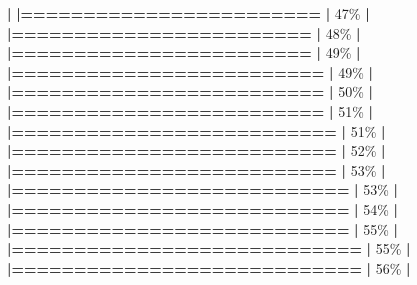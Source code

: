 \documentclass[
]{book}
\newenvironment{Shaded}{\begin{snugshade}}{\end{snugshade}}
\newcommand{\DecValTok}[1]{\textcolor[rgb]{0.00,0.00,0.81}{#1}}
\newcommand{\ErrorTok}[1]{\textcolor[rgb]{0.64,0.00,0.00}{\textbf{#1}}}
\newcommand{\NormalTok}[1]{#1}
\newcommand{\SpecialCharTok}[1]{\textcolor[rgb]{0.81,0.36,0.00}{\textbf{#1}}}
\begin{document}
\begin{Shaded}
\begin{Highlighting}[]
  \SpecialCharTok{|}                                                        
  \ErrorTok{|========================}                          \ErrorTok{|}  \DecValTok{47}\NormalTok{\%}
  \SpecialCharTok{|}                                                        
  \ErrorTok{|========================}                          \ErrorTok{|}  \DecValTok{48}\NormalTok{\%}
  \SpecialCharTok{|}                                                        
  \ErrorTok{|========================}                          \ErrorTok{|}  \DecValTok{49}\NormalTok{\%}
  \SpecialCharTok{|}                                                        
  \ErrorTok{|=========================}                         \ErrorTok{|}  \DecValTok{49}\NormalTok{\%}
  \SpecialCharTok{|}                                                        
  \ErrorTok{|=========================}                         \ErrorTok{|}  \DecValTok{50}\NormalTok{\%}
  \SpecialCharTok{|}                                                        
  \ErrorTok{|=========================}                         \ErrorTok{|}  \DecValTok{51}\NormalTok{\%}
  \SpecialCharTok{|}                                                        
  \ErrorTok{|==========================}                        \ErrorTok{|}  \DecValTok{51}\NormalTok{\%}
  \SpecialCharTok{|}                                                        
  \ErrorTok{|==========================}                        \ErrorTok{|}  \DecValTok{52}\NormalTok{\%}
  \SpecialCharTok{|}                                                        
  \ErrorTok{|==========================}                        \ErrorTok{|}  \DecValTok{53}\NormalTok{\%}
  \SpecialCharTok{|}                                                        
  \ErrorTok{|===========================}                       \ErrorTok{|}  \DecValTok{53}\NormalTok{\%}
  \SpecialCharTok{|}                                                        
  \ErrorTok{|===========================}                       \ErrorTok{|}  \DecValTok{54}\NormalTok{\%}
  \SpecialCharTok{|}                                                        
  \ErrorTok{|===========================}                       \ErrorTok{|}  \DecValTok{55}\NormalTok{\%}
  \SpecialCharTok{|}                                                        
  \ErrorTok{|============================}                      \ErrorTok{|}  \DecValTok{55}\NormalTok{\%}
  \SpecialCharTok{|}                                                        
  \ErrorTok{|============================}                      \ErrorTok{|}  \DecValTok{56}\NormalTok{\%}
  \SpecialCharTok{|}                                                        

\end{Highlighting}
\end{Shaded}
\end{document}
